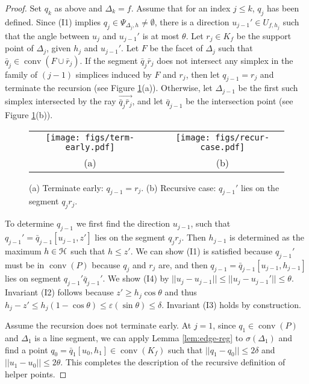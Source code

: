 \documentclass[11pt]{myclass}
\newcommand{\eps}{\varepsilon}
\renewcommand{\c}[1]{\ensuremath{\EuScript{#1}}}
\newcommand{\conv}[1]{\mathop{\mathrm{conv}}(#1)}
\newcommand{\fq}{\bar{q}}
\newcommand{\fr}{\bar{r}}
\newcommand{\point}[3]{{#1}[#3,#2]}
\begin{document}
\begin{proof} 
Set $q_k$ as above and $\Delta_k = f$.    
Assume that for an index $j\leq k$, $q_j$ has been defined.  
Since (I1) implies $q_j \in \Psi_{\Delta_j, h} \neq \emptyset$, 
there is a direction $u_{j-1}' \in U_{f,h_j}$ such that the angle between $u_j$ and $u_{j-1}'$ is at most $\theta$.  
Let $r_j \in K_f$ be the support point of $\Delta_j$, given $h_j$ and $u_{j-1}'$. 
Let $F$ be the facet of $\Delta_j$ such that $\fq_j \in \conv{F \cup \fr_j}$.  If the segment $\fq_j \fr_j$ does not intersect any simplex in the family of $(j-1)$ simplices induced by $F$ and $r_j$, then let $q_{j-1} = r_j$ and terminate the recursion (see Figure \ref{fig:recursive_def}(a)).  
Otherwise, let $\Delta_{j-1}$ be the first such simplex intersected by the ray $\overrightarrow{\fq_j \fr_j}$, and let $\fq_{j-1}$ be the intersection point (see Figure \ref{fig:recursive_def}(b)).  
  
\begin{figure}[htb!]
\begin{center}
{\small 
\begin{tabular}{ccc}
\texttt{[image: figs/term-early.pdf]} 
& \hspace{1cm} & 
\texttt{[image: figs/recur-case.pdf]} \\
(a)  && (b) 
\end{tabular}
}
\end{center}
\caption{(a) Terminate early: $q_{j-1} = r_j$. (b) Recursive case: $q_{j-1}'$ lies on the segment $q_j r_j$. }
\label{fig:recursive_def}
\end{figure}

To determine $q_{j-1}$ we first find the direction $u_{j-1}$, such that $q_{j-1}' = \point{\fq_{j-1}}{z'}{u_{j-1}}$ lies on the segment $q_j r_j$.  Then $h_{j-1}$ is determined as the maximum $h \in \c{H}$ such that $h \leq z'$. 
We can show (I1) is satisfied because $q_{j-1}'$ must be in $\conv{P}$ because $q_j$ and $r_j$ are, and then $q_{j-1} = \point{\fq_{j-1}}{h_{j-1}}{u_{j-1}}$ lies on segment $q_{j-1}' \fq_{j-1}'$.  
We show (I4) by $||u_j - u_{j-1}|| \leq ||u_j - u_{j-1}'|| \leq \theta$.  Invariant (I2) follows because $z' \geq h_j \cos \theta$ and thus $h_j - z' \leq h_j (1-\cos \theta) \leq \eps (\sin \theta) \leq \delta$.  
Invariant (I3) holds by construction.   

Assume the recursion does not terminate early.  At $j=1$, since $q_1 \in \conv{P}$ and $\Delta_1$ is a line segment, we can apply Lemma \ref{lem:edge-reg} to $\sigma(\Delta_1)$ and find a point $q_0 = \point{\fq_1}{h_1}{u_0} \in \conv{K_f}$ such that $||q_1 - q_0|| \leq 2\delta$ and $||u_1 - u_0|| \leq 2\theta$.  
This completes the description of the recursive definition of helper points.  
\end{proof}
\end{document}
